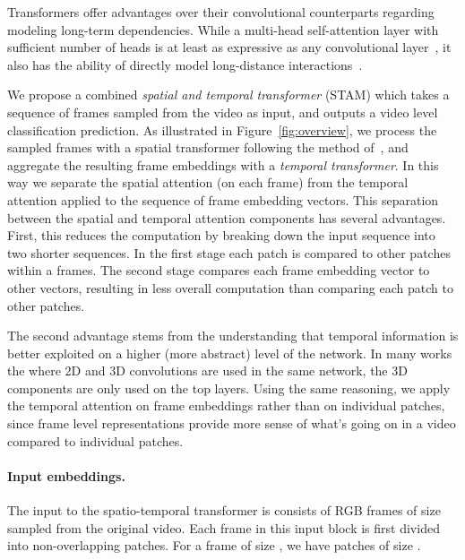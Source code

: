 \documentclass[10pt,twocolumn,letterpaper]{article}
\begin{document}
Transformers offer advantages over their convolutional counterparts regarding modeling long-term dependencies. While a multi-head self-attention
layer with sufficient number of heads is at least as expressive as any convolutional
layer~\cite{cordonnier2019relationship}, it also has the ability of
directly model long-distance interactions~\cite{ramachandran2019stand}.












We propose a combined \emph{spatial and temporal transformer} (STAM) which takes a sequence of frames sampled from the video as input, and outputs a video level classification prediction. As illustrated in Figure~\ref{fig:overview},
we process the sampled frames with a spatial transformer following the method of~\cite{dosovitskiy2021an}, and aggregate the resulting frame embeddings with a \emph{temporal transformer}.  In this way we separate the spatial attention (on each frame) from the temporal attention applied to the sequence of frame embedding vectors.  This separation between the spatial and temporal attention components has several advantages.  First, this reduces the computation by breaking down the input sequence into two shorter sequences.  In the first stage each patch is compared to  other patches within a frames.  The second stage compares each frame embedding vector to  other vectors, resulting in less overall computation than comparing each patch to  other patches.

The second advantage stems from the understanding that temporal information is better exploited on a higher (more abstract) level of the network.  In many works the where 2D and 3D convolutions are used in the same network, the 3D components are only used on the top layers.  Using the same reasoning, we apply the temporal attention on frame embeddings rather than on individual patches, since frame level representations provide more sense of what's going on in a video compared to individual patches.


\paragraph{Input embeddings.} The input to the spatio-temporal transformer is  consists of  RGB frames of size  sampled from the original video. Each frame in this input block is first divided into non-overlapping patches. For a frame of size , we have  patches of size . 
\end{document}
